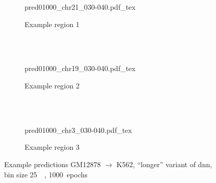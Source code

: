\begin{figure}[p]
    \begin{subfigure}{\textwidth}
        \centering
        \scriptsize
        {pred01000_chr21_030-040.pdf_tex}
        \caption{Example  region 1} \label{fig:results:longer_r1}
    \end{subfigure}\\[2mm]
    \\[3mm]
    \begin{subfigure}{\textwidth}
        \centering
        \scriptsize
        {pred01000_chr19_030-040.pdf_tex}
        \caption{Example region 2} \label{fig:results:longer_r2}
    \end{subfigure}\\[2mm]
    \\[3mm]
    \begin{subfigure}{\textwidth}
        \centering
        \scriptsize
        {pred01000_chr3_030-040.pdf_tex}
        \caption{Example region 3} \label{fig:results:longer_r3}
    \end{subfigure}
    \caption{Example predictions GM12878 $\rightarrow$ K562, ``longer'' variant of \acrshort{dnn},\\bin size \SI{25}{\kilo\bp}, 1000~epochs} \label{fig:results:longer_matrices}
\end{figure}
